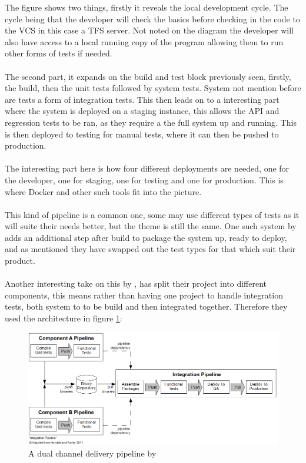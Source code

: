 The figure shows two things, firstly it reveals the local development cycle. The cycle being that the developer will check the basics before checking in the code to the VCS in this case a TFS server. Not noted on the diagram the developer will also have access to a local running copy of the program allowing them to run other forms of tests if needed. 
\\\\
The second part, it expands on the build and test block previously seen, firstly, the build, then the unit tests followed by system tests. System not mention before are tests a form of integration tests. This then leads on to a interesting part where the system is deployed on a staging instance, this allows the API and regression tests to be ran, as they require a the full system up and running. This is then deployed to testing  for manual tests, where it can then be pushed to production.
\\\\
The interesting part here is how four different deployments are needed, one for the developer, one for staging, one for testing and one for production. This is where Docker and other such tools fit into the picture.
\\\\
This kind of pipeline is a common one, some may use different types of tests as it will suite their needs better, but the theme is still the same. One such system by \cite{zend} adds an additional step after build to package the system up, ready to deploy, and as mentioned they have swapped out the test types for that which suit their product.
\\\\
Another interesting take on this by \cite{codeahoy}, has split their project into different components, this means rather than having one project to handle integration tests, both system to to be build and then integrated together. Therefore they used the architecture in figure \ref{fig:codeahoy}:

\begin{figure}[H]
	\centering
	\includegraphics[scale=0.5]{images/codeahoy.png}
	\caption{A dual channel delivery pipeline by \cite{codeahoy}}
	\label{fig:codeahoy}
\end{figure}

